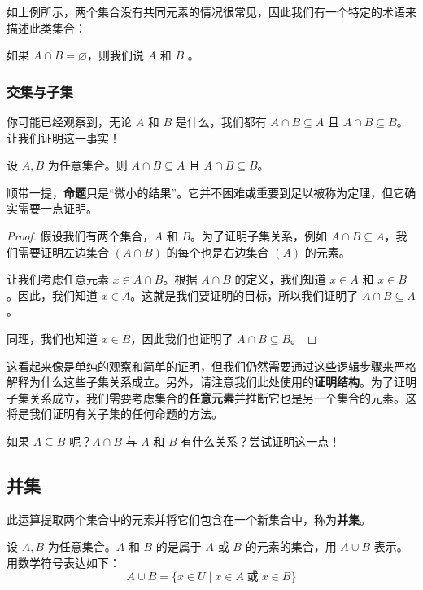 如上例所示，两个集合没有共同元素的情况很常见，因此我们有一个特定的术语来描述此类集合：

\begin{definition}
    如果 $A \cap B = \varnothing$，则我们说 $A$ 和 $B$ 。
\end{definition}

\subsubsection*{交集与子集}

你可能已经观察到，无论 $A$ 和 $B$ 是什么，我们都有 $A \cap B \subseteq A$ 且 $A \cap B \subseteq B$。让我们证明这一事实！

\begin{proposition}
    设 $A, B$ 为任意集合。则 $A \cap B \subseteq A$ 且 $A \cap B \subseteq B$。
\end{proposition}

顺带一提，\textbf{命题}只是``微小的结果''。它并不困难或重要到足以被称为定理，但它确实需要一点证明。

\begin{proof}
    假设我们有两个集合，$A$ 和 $B$。为了证明子集关系，例如 $A \cap B \subseteq A$，我们需要证明左边集合 $(A \cap B)$ 的每个也是右边集合 $(A)$ 的元素。

    让我们考虑任意元素 $x \in A \cap B$。根据 $A \cap B$ 的定义，我们知道 $x \in A$ 和 $x \in B$。因此，我们知道 $x \in A$。这就是我们要证明的目标，所以我们证明了 $A \cap B \subseteq A$。

    同理，我们也知道 $x \in B$，因此我们也证明了 $A \cap B \subseteq B$。
\end{proof}

这看起来像是单纯的观察和简单的证明，但我们仍然需要通过这些逻辑步骤来严格解释为什么这些子集关系成立。另外，请注意我们此处使用的\textbf{证明结构}。为了证明子集关系成立，我们需要考虑集合的\textbf{任意元素}并推断它也是另一个集合的元素。这将是我们证明有关子集的任何命题的方法。

如果 $A \subseteq B$ 呢？$A \cap B$ 与 $A$ 和 $B$ 有什么关系？尝试证明这一点！

\subsection{并集}

此运算提取两个集合中的元素并将它们包含在一个新集合中，称为\textbf{并集}。

\begin{definition}
    设 $A, B$ 为任意集合。$A$ 和 $B$ 的是属于 $A$ 或 $B$ 的元素的集合，用 $A \cup B$ 表示。用数学符号表达如下：
    \[A \cup B = \{x \in U \mid x \in A \;\text{或}\; x \in B\}\]
\end{definition}

